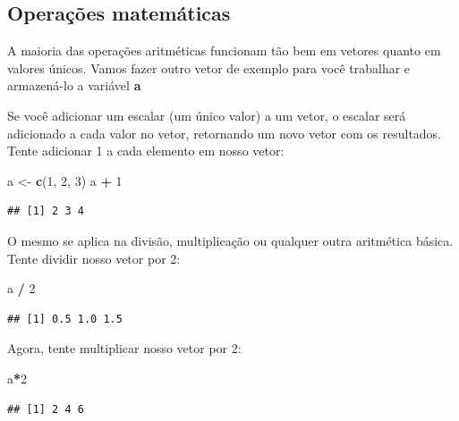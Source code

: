 \documentclass[
]{book}
\newenvironment{Shaded}{\begin{snugshade}}{\end{snugshade}}
\newcommand{\DecValTok}[1]{\textcolor[rgb]{0.00,0.00,0.81}{#1}}
\newcommand{\KeywordTok}[1]{\textcolor[rgb]{0.13,0.29,0.53}{\textbf{#1}}}
\newcommand{\NormalTok}[1]{#1}
\newcommand{\OperatorTok}[1]{\textcolor[rgb]{0.81,0.36,0.00}{\textbf{#1}}}
\newcommand{\StringTok}[1]{\textcolor[rgb]{0.31,0.60,0.02}{#1}}
\begin{document}
\hypertarget{operauxe7uxf5es-matemuxe1ticas}{%
\subsection{Operações matemáticas}\label{operauxe7uxf5es-matemuxe1ticas}}

A maioria das operações aritméticas funcionam tão bem em vetores quanto em valores únicos. Vamos fazer outro vetor de exemplo para você trabalhar e armazená-lo a variável \textbf{a}

Se você adicionar um escalar (um único valor) a um vetor, o escalar será adicionado a cada valor no vetor, retornando um novo vetor com os resultados. Tente adicionar 1 a cada elemento em nosso vetor:

\begin{Shaded}
\begin{Highlighting}[]
\NormalTok{a <-}\StringTok{ }\KeywordTok{c}\NormalTok{(}\DecValTok{1}\NormalTok{, }\DecValTok{2}\NormalTok{, }\DecValTok{3}\NormalTok{)}
\NormalTok{a }\OperatorTok{+}\StringTok{ }\DecValTok{1}
\end{Highlighting}
\end{Shaded}

\begin{verbatim}
## [1] 2 3 4
\end{verbatim}

O mesmo se aplica na divisão, multiplicação ou qualquer outra aritmética básica. Tente dividir nosso vetor por 2:

\begin{Shaded}
\begin{Highlighting}[]
\NormalTok{a }\OperatorTok{/}\StringTok{ }\DecValTok{2}
\end{Highlighting}
\end{Shaded}

\begin{verbatim}
## [1] 0.5 1.0 1.5
\end{verbatim}

Agora, tente multiplicar nosso vetor por 2:

\begin{Shaded}
\begin{Highlighting}[]
\NormalTok{a}\OperatorTok{*}\DecValTok{2}
\end{Highlighting}
\end{Shaded}

\begin{verbatim}
## [1] 2 4 6
\end{verbatim}
\end{document}
